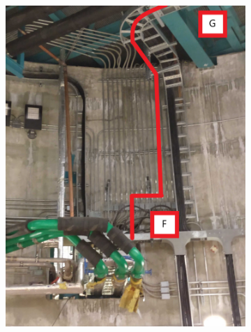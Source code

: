 \begin{figure}
  \centering
  \begin{subfigure}{0.48\textwidth}
    \centering
    \includegraphics[width=\textwidth]{images/19.jpg}
  \end{subfigure}
  \hfill
  \begin{subfigure}{0.48\textwidth}
    \centering

\end{subfigure}
\end{figure}
